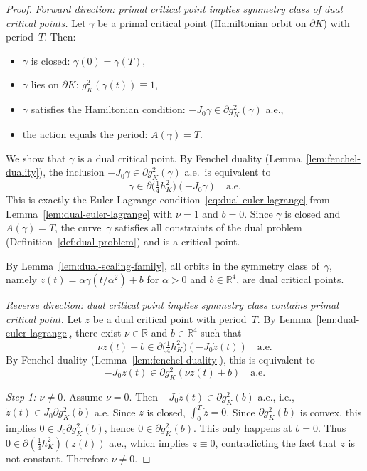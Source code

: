 \begin{proof}
\emph{Forward direction: primal critical point implies symmetry class of dual critical points.}
Let $\gamma$ be a primal critical point (Hamiltonian orbit on $\partial K$)
with period~$T$. Then:
\begin{itemize}
\item $\gamma$ is closed: $\gamma(0) = \gamma(T)$,
\item $\gamma$ lies on $\partial K$: $g_K^2(\gamma(t)) \equiv 1$,
\item $\gamma$ satisfies the Hamiltonian condition:
  $-J_0\dot{\gamma} \in \partial g_K^2(\gamma)$ a.e.,
\item the action equals the period: $A(\gamma) = T$.
\end{itemize}

We show that $\gamma$ is a dual critical point.
By Fenchel duality (Lemma~\ref{lem:fenchel-duality}),
the inclusion $-J_0\dot{\gamma} \in \partial g_K^2(\gamma)$ a.e.\ is equivalent to
\[
  \gamma \in \partial\bigl(\tfrac{1}{4}h_K^2\bigr)(-J_0\dot{\gamma})
  \quad\text{a.e.}
\]
This is exactly the Euler-Lagrange condition~\eqref{eq:dual-euler-lagrange}
from Lemma~\ref{lem:dual-euler-lagrange} with $\nu = 1$ and $b = 0$.
Since $\gamma$ is closed and $A(\gamma) = T$, the curve~$\gamma$ satisfies
all constraints of the dual problem (Definition~\ref{def:dual-problem})
and is a critical point.

By Lemma~\ref{lem:dual-scaling-family}, all orbits in the symmetry class of~$\gamma$,
namely $z(t) = \alpha\gamma(t/\alpha^2) + b$ for $\alpha > 0$ and $b \in \mathbb{R}^4$,
are dual critical points.

\medskip
\emph{Reverse direction: dual critical point implies symmetry class contains primal critical point.}
Let $z$ be a dual critical point with period~$T$. By Lemma~\ref{lem:dual-euler-lagrange},
there exist $\nu \in \mathbb{R}$ and $b \in \mathbb{R}^4$ such that
\begin{equation}\label{eq:dual-el-for-z}
  \nu z(t) + b \in \partial\bigl(\tfrac{1}{4}h_K^2\bigr)(-J_0\dot{z}(t))
  \quad\text{a.e.}
\end{equation}
By Fenchel duality (Lemma~\ref{lem:fenchel-duality}), this is equivalent to
\[
  -J_0\dot{z}(t) \in \partial g_K^2(\nu z(t) + b) \quad\text{a.e.}
\]

\emph{Step 1: $\nu \neq 0$.}
Assume $\nu = 0$. Then $-J_0\dot{z}(t) \in \partial g_K^2(b)$ a.e.,
i.e., $\dot{z}(t) \in J_0\partial g_K^2(b)$ a.e.
Since $z$ is closed, $\int_0^T \dot{z} = 0$.
Since $\partial g_K^2(b)$ is convex, this implies $0 \in J_0\partial g_K^2(b)$,
hence $0 \in \partial g_K^2(b)$.
This only happens at $b = 0$.
Thus $0 \in \partial(\tfrac{1}{4}h_K^2)(\dot{z}(t))$ a.e., which implies $\dot{z} \equiv 0$,
contradicting the fact that $z$ is not constant.
Therefore $\nu \neq 0$.


\end{proof}

